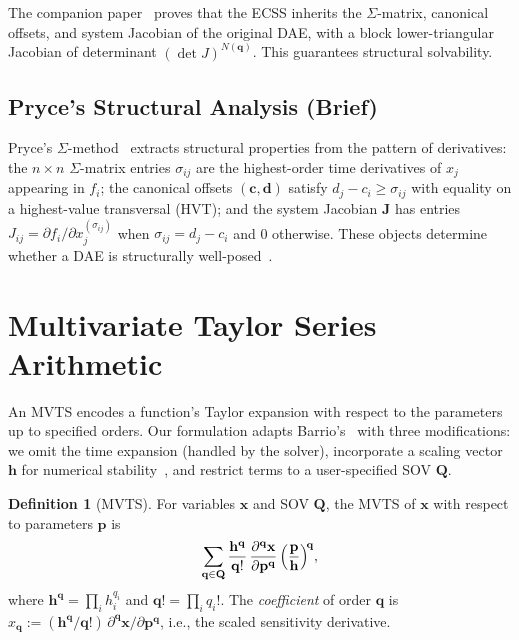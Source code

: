 \documentclass[12pt,a4paper]{article}
\theoremstyle{definition}
\newtheorem{definition}{Definition}[section]
\theoremstyle{plain}
\theoremstyle{remark}
\newcommand{\vx}{\mathbf{x}}
\newcommand{\vp}{\mathbf{p}}
\newcommand{\vq}{\mathbf{q}}
\newcommand{\vQ}{\mathbf{Q}}
\newcommand{\vc}{\mathbf{c}}
\newcommand{\vd}{\mathbf{d}}
\newcommand{\vh}{\mathbf{h}}
\newcommand{\Jb}{\mathbf{J}}
\begin{document}
The companion paper~\cite{cao2026structural} proves that the ECSS inherits the $\Sigma$-matrix, canonical offsets, and system Jacobian of the original DAE, with a block lower-triangular Jacobian of determinant $(\det J)^{N(\vq)}$. This guarantees structural solvability.

\subsection{Pryce's Structural Analysis (Brief)}

Pryce's $\Sigma$-method~\cite{pryce2001simple} extracts structural properties from the pattern of derivatives: the $n\times n$ $\Sigma$-matrix entries $\sigma_{ij}$ are the highest-order time derivatives of $x_j$ appearing in $f_i$; the canonical offsets $(\vc,\vd)$ satisfy $d_j-c_i\ge\sigma_{ij}$ with equality on a highest-value transversal (HVT); and the system Jacobian $\Jb$ has entries $J_{ij}=\partial f_i/\partial x_j^{(\sigma_{ij})}$ when $\sigma_{ij}=d_j-c_i$ and 0 otherwise. These objects determine whether a DAE is structurally well-posed~\cite{brenan1995numerical}.

\section{Multivariate Taylor Series Arithmetic}
\label{sec:mvts}

An MVTS encodes a function's Taylor expansion with respect to the parameters up to specified orders. Our formulation adapts Barrio's~\cite{barrio2006sensitivity} with three modifications: we omit the time expansion (handled by the solver), incorporate a scaling vector $\vh$ for numerical stability~\cite{goldberg1991every,higham2002accuracy}, and restrict terms to a user-specified SOV $\vQ$.

\begin{definition}[MVTS]
For variables $\vx$ and SOV $\vQ$, the MVTS of $\vx$ with respect to parameters $\vp$ is
\begin{equation}\label{eq:mvts}
  \sum_{\vq\in\vQ} \frac{\vh^\vq}{\vq!}\,
  \frac{\partial^{\vq}\vx}{\partial\vp^{\vq}}\,
  \Bigl(\frac{\vp}{\vh}\Bigr)^{\!\vq},
\end{equation}
where $\vh^\vq = \prod_i h_i^{q_i}$ and $\vq! = \prod_i q_i!$. The \emph{coefficient} of order $\vq$ is $x_{\vq} := (\vh^\vq/\vq!)\,\partial^{\vq}\vx/\partial\vp^{\vq}$, i.e., the scaled sensitivity derivative.
\end{definition}
\end{document}
